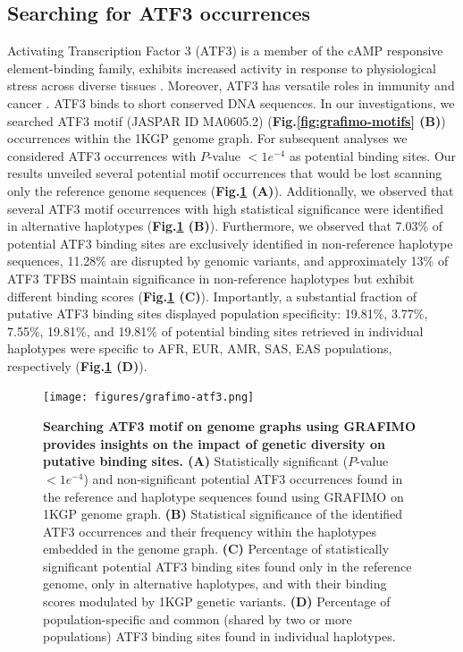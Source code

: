 \documentclass[a4paper, titlepage, openright]{book}
\newcommand{\grafimo}{GRAFIMO\xspace}
\begin{document}
\subsection{Searching for ATF3 occurrences}
Activating Transcription Factor 3 (ATF3) is a member of the cAMP responsive element-binding family, exhibits increased activity in response to physiological stress across diverse tissues \citep{chen1996analysis}. Moreover, ATF3 has versatile roles in immunity and cancer \citep{thompson2009atf3}. ATF3 binds to short conserved DNA sequences. In our investigations, we searched ATF3 motif (JASPAR ID MA0605.2) (\textbf{Fig.\ref{fig:grafimo-motifs} (B)}) occurrences within the 1KGP genome graph. For subsequent analyses we considered ATF3 occurrences with $P$-value $< 1e^{-4}$ as potential binding sites. Our results unveiled several potential motif occurrences that would be lost scanning only the reference genome sequences (\textbf{Fig.\ref{fig:grafimo-atf3} (A)}). Additionally, we observed that several ATF3 motif occurrences with high statistical significance were identified in alternative haplotypes (\textbf{Fig.\ref{fig:grafimo-atf3} (B)}). Furthermore, we observed that 7.03\% of potential ATF3 binding sites are exclusively identified in non-reference haplotype sequences, 11.28\% are disrupted by genomic variants, and approximately 13\% of ATF3 TFBS maintain significance in non-reference haplotypes but exhibit different binding scores (\textbf{Fig.\ref{fig:grafimo-atf3} (C)}). Importantly, a substantial fraction of putative ATF3 binding sites displayed population specificity: 19.81\%, 3.77\%, 7.55\%, 19.81\%, and 19.81\% of potential binding sites retrieved in individual haplotypes were specific to AFR, EUR, AMR, SAS, EAS populations, respectively (\textbf{Fig.\ref{fig:grafimo-atf3} (D)}). 

\begin{figure}
    \centering
    \texttt{[image: figures/grafimo-atf3.png]}
    \caption[Searching ATF3 motif on genome graphs using \grafimo provides insights on the impact of genetic diversity on putative binding sites]{\textbf{Searching ATF3 motif on genome graphs using \grafimo provides insights on the impact of genetic diversity on putative binding sites. (A)} Statistically significant ($P$-value $< 1e^{-4}$) and non-significant potential ATF3 occurrences found in the reference and haplotype sequences found using \grafimo on 1KGP genome graph. \textbf{(B)} Statistical significance of the identified ATF3 occurrences and their frequency within the haplotypes embedded in the genome graph. \textbf{(C)} Percentage of statistically significant potential ATF3 binding sites found only in the reference genome, only in alternative haplotypes, and with their binding scores modulated by 1KGP genetic variants. \textbf{(D)} Percentage of population-specific and common (shared by two or more populations) ATF3 binding sites found in individual haplotypes.}
    \label{fig:grafimo-atf3}
\end{figure}
\end{document}
